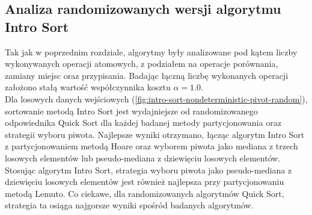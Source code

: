 \begin{figure}[]
	\centering
	
	\caption[]{}
	\label{fig:intro-sort-deterministic-pivot-random}
\end{figure}

\begin{figure}[]
	\centering
	
	\caption[]{}
	\label{fig:intro-sort-deterministic-pivot-reversed}
\end{figure}

\begin{figure}[]
	\centering
	
	\caption[]{}
	\label{fig:intro-sort-deterministic-pivot-density}
\end{figure}

\begin{figure}[]
	\centering
	
	\caption[]{}
	\label{fig:intro-sort-deterministic-pivot-random-all}
\end{figure}

\subsection{Analiza randomizowanych wersji algorytmu Intro Sort}
Tak jak w poprzednim rozdziale, algorytmy były analizowane pod kątem liczby wykonywanych operacji atomowych, z podziałem na operacje porównania, zamiany miejsc oraz przypisania. Badając łączną liczbę wykonanych operacji założono stałą wartość współczynnika kosztu $\alpha = 1.0$.\\

Dla losowych danych wejściowych (\ref{fig:intro-sort-nondeterministic-pivot-random}), sortowanie metodą Intro Sort jest wydajniejsze od randomizowanego odpowiednika Quick Sort dla każdej badanej metody partycjonowania oraz strategii wyboru piwota. Najlepsze wyniki otrzymano, łącząc algorytm Intro Sort z partycjonowaniem metodą Hoare oraz wyborem piwota jako mediana z trzech losowych elementów lub pseudo-mediana z dziewięciu losowych elementów. Stosując algorytm Intro Sort, strategia wyboru piwota jako pseudo-mediana z dziewięciu losowych elementów jest również najlepsza przy partycjonowaniu metodą Lemuto. Co ciekawe, dla randomizowanych algorytmów Quick Sort, strategia ta osiąga najgorsze wyniki spośród badanych algorytmów.\\

